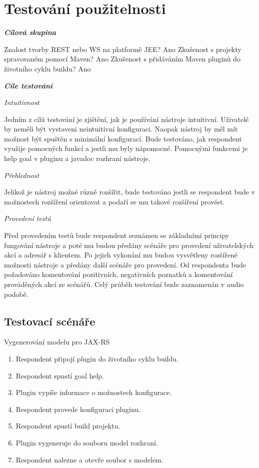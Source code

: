 \documentclass[11pt,twoside,a4paper]{book}
\begin{document}
\section{Testování použitelnosti}

\textbf{\textit{Cílová skupina}}

Znalost tvorby REST nebo WS na platformě JEE? Ano
Zkušenost s projekty spravovaném pomocí Maven? Ano
Zkušenost s přidáváním Maven pluginů do životního cyklu buildu? Ano

\textbf{\textit{Cíle testování}}

\textit{Intuitivnost}

Jedním z cílů testování je zjištění, jak je používání nástroje intuitivní. Uživatelé by neměli být
vystaveni neintuitivní konfiguraci. Naopak nástroj by měl mít možnost být spuštěn s
minimální konfigurací. Bude testováno, jak respondent využije pomocných funkcí a jestli mu
byly nápomocné. Pomocnými funkcemi je help goal v pluginu a javadoc rozhraní nástroje.

\textit{Přehlednost}

Jelikož je nástroj možné různě rozšířit, bude testováno jestli se respondent bude v možnostech
rozšíření orientovat a podaří se mu takové rozšíření provést.

\textit{Provedení testů}

Před provedením testů bude respondent seznámen se základními principy fungování nástroje a
poté mu budou předány scénáře pro provedení uživatelských akcí a adresář s klientem. Po
jejich vykonání mu budou vysvětleny rozšířené možnosti nástroje a předány další scénáře pro
provedení. Od respondenta bude požadováno komentování pozitivních, negativních poznatků
a komentování prováděných akcí ze scénářů. Celý průběh testování bude zaznamenán v audio
podobě.

\subsection{Testovací scénáře}

Vygenerování modelu pro JAX-RS

\begin{enumerate}
  \item Respondent připojí plugin do životního cyklu buildu.
  
  \item Respondent spustí goal help.
  
  \item Plugin vypíše informace o možnostech konfigurace.
  
  \item Respondent provede konfiguraci pluginu.
  
  \item Respondent spustí build projektu.
  
  \item Plugin vygeneruje do souboru model rozhraní.
  
  \item Respondent nalezne a otevře soubor s modelem.
\end{enumerate}
\end{document}
